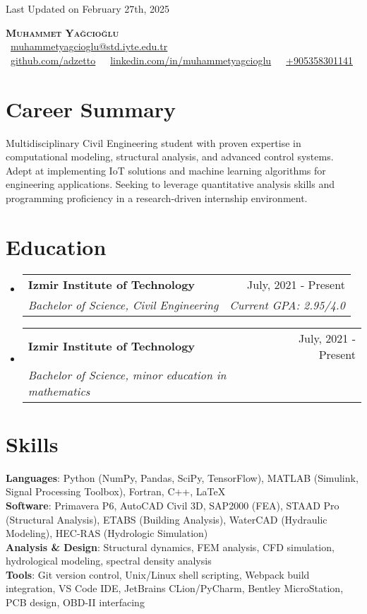 \documentclass[letterpaper,11pt]{article}
\makeatletter
\newcommand{\resumeSubheading}[4]{\vspace{-2pt}\item\begin{tabular*}{0.97\textwidth}[t]{l@{\extracolsep{\fill}}r}\textbf{#1} & #2 \\
\textit{\small#3} & \textit{\small #4} \\
\end{tabular*}\vspace{-7pt}}
\newcommand{\resumeSubHeadingListStart}{\begin{itemize}[leftmargin=0.15in, label={}]}
\newcommand{\resumeSubHeadingListEnd}{\end{itemize}}
\makeatother
\begin{document}
\begin{flushright}\color{gray}Last Updated on February 27th, 2025\end{flushright}
\vspace{-5pt}
\begin{center}
\textbf{\Huge \scshape Muhammet Ya\u{g}c\i{o}\u{g}lu} \\ \vspace{8pt}
\small {}\ \href{mailto:muhammetyagcioglu@std.iyte.edu.tr}{\underline{muhammetyagcioglu@std.iyte.edu.tr}}\\
\ \href{https://github.com/adzetto}{\underline{github.com/adzetto}}\ $ $\ \ \href{https://linkedin.com/in/muhammetyagcioglu}{\underline{linkedin.com/in/muhammetyagcioglu}}\ $ $\ \ \underline{+905358301141}\\
\end{center}

\section{Career Summary}
Multidisciplinary Civil Engineering student with proven expertise in computational modeling, structural analysis, and advanced control systems. Adept at implementing IoT solutions and machine learning algorithms for engineering applications. Seeking to leverage quantitative analysis skills and programming proficiency in a research-driven internship environment.

\section{Education}
  \resumeSubHeadingListStart
    \resumeSubheading{Izmir Institute of Technology}{July, 2021 - Present}{Bachelor of Science, Civil Engineering}{Current GPA: 2.95/4.0}
    \resumeSubheading{Izmir Institute of Technology}{July, 2021 - Present}{Bachelor of Science, minor education in mathematics}{}
  \resumeSubHeadingListEnd

\section{Skills}
 \begin{itemize}[leftmargin=0.15in, label={}]
    \small{\item{\textbf{Languages}{: Python (NumPy, Pandas, SciPy, TensorFlow), MATLAB (Simulink, Signal Processing Toolbox), Fortran, C++, \LaTeX} \\
     \textbf{Software}{: Primavera P6, AutoCAD Civil 3D, SAP2000 (FEA), STAAD Pro (Structural Analysis), ETABS (Building Analysis), WaterCAD (Hydraulic Modeling), HEC-RAS (Hydrologic Simulation)}\\
     \textbf{Analysis \& Design}{: Structural dynamics, FEM analysis, CFD simulation, hydrological modeling, spectral density analysis}\\
     \textbf{Tools}{: Git version control, Unix/Linux shell scripting, Webpack build integration, VS Code IDE, JetBrains CLion/PyCharm, Bentley MicroStation, PCB design, OBD-II interfacing}}}
 \end{itemize}
\end{document}
